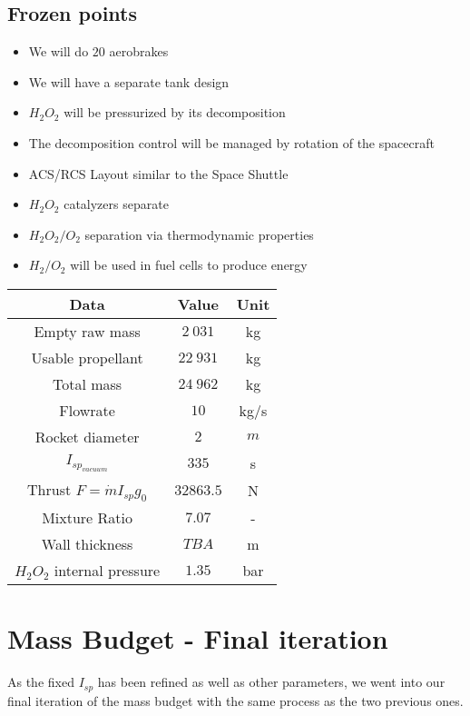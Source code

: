 \subsection{Frozen points}
\begin{itemize}
\item We will do $20$ aerobrakes
\item We will have a separate tank design
\item $H_2O_2$ will be pressurized by its decomposition
\item The decomposition control will be managed by rotation of the spacecraft
\item ACS/RCS Layout similar to the Space Shuttle
\item $H_2O_2$ catalyzers separate
\item $H_2O_2/O_2$ separation via thermodynamic properties
\item $H_2/O_2$ will be used in fuel cells to produce energy
\end{itemize}
\begin{center}
\begin{tabular}[H]{|c|c|c|}
	\hline
	\cellcolor{gray!50}Data & \cellcolor{gray!50}Value & \cellcolor{gray!50}Unit\\
	\hline
	Empty raw mass & $2\ 031$ & kg\\
	\hline
	Usable propellant & $22\ 931$ &kg\\
	\hline
	\cellcolor{green!50}Total mass & \cellcolor{green!50}$24\ 962$ & \cellcolor{green!50}kg\\
	\hline
	Flowrate & $10$ & kg/s\\
	\hline
	Rocket diameter & $2$ & $m$\\
	\hline
	$I_{sp_{vacuum}}$ & $335$ & s\\
	\hline
	Thrust $F=\dot m I_{sp} g_0$ & $32 863.5$ &N\\
	\hline
	Mixture Ratio & $7.07$ & -\\
	\hline
	Wall thickness & $TBA$ & m\\
	\hline
	$H_2O_2$ internal pressure & $1.35$ & bar\\
	\hline
\end{tabular}
\end{center}
\newpage
\section{Mass Budget - Final iteration}
As the fixed $I_{sp}$ has been refined as well as other parameters, we went into our final iteration of the mass budget with the same process as the two previous ones.
